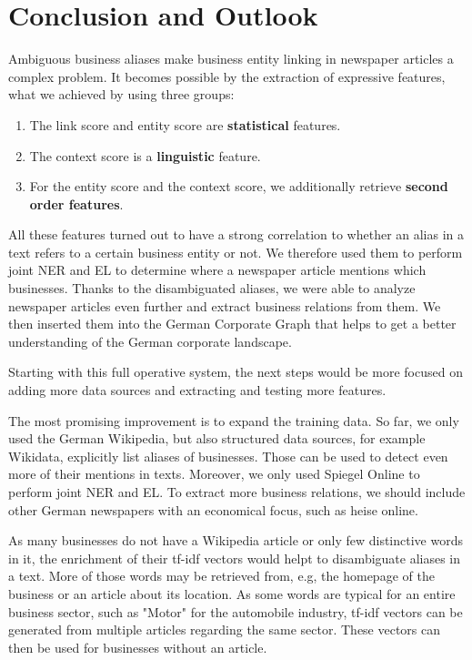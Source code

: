 \section{Conclusion and Outlook}
\label{sec:conclusion}
Ambiguous business aliases make business entity linking in newspaper articles a complex problem. It becomes possible by the extraction of expressive features, what we achieved by using three groups:

\begin{enumerate}
\item The link score and entity score are \textbf{statistical} features.
\item The context score is a \textbf{linguistic} feature.
\item For the entity score and the context score, we additionally retrieve \textbf{second order features}.
\end {enumerate}

All these features turned out to have a strong correlation to whether an alias in a text refers to a certain business entity or not. We therefore used them to perform joint NER and EL to determine where a newspaper article mentions which businesses. Thanks to the disambiguated aliases, we were able to analyze newspaper articles even further and extract business relations from them. We then inserted them into the German Corporate Graph that helps to get a better understanding of the German corporate landscape.

Starting with this full operative system, the next steps would be more focused on adding more data sources and extracting and testing more features.

The most promising improvement is to expand the training data. So far, we only used the German Wikipedia, but also structured data sources, for example Wikidata, explicitly list aliases of businesses. Those can be used to detect even more of their mentions in texts. Moreover, we only used Spiegel Online to perform joint NER and EL. To extract more business relations, we should include other German newspapers with an economical focus, such as heise online\footnotemark{}.

As many businesses do not have a Wikipedia article or only few distinctive words in it, the enrichment of their tf-idf vectors would helpt to disambiguate aliases in a text. More of those words may be retrieved from, e.g, the homepage of the business or an article about its location. As some words are typical for an entire business sector, such as "Motor" for the automobile industry, tf-idf vectors can be generated from multiple articles regarding the same sector. These vectors can then be used for businesses without an article.

